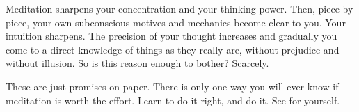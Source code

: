 Meditation sharpens your concentration and your thinking power. Then, piece by
piece, your own subconscious motives and mechanics become clear to you. Your
intuition sharpens. The precision of your thought increases and gradually you
come to a direct knowledge of things as they really are, without prejudice and
without illusion. So is this reason enough to bother? Scarcely.

These are just promises on paper. There is only one way you will ever know if
meditation is worth the effort. Learn to do it right, and do it. See for
yourself.


